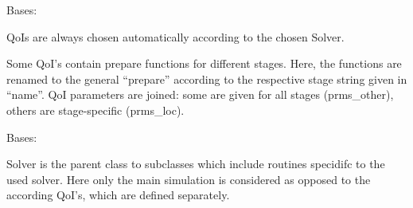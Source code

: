 \documentclass[letterpaper,10pt,english]{sphinxmanual}
\begin{document}
\begin{fulllineitems}
\label{\detokenize{solver:solver.solver.QoI}}
Bases: {\hyperref[\detokenize{solver:solver.solver.Batch}]{}}

QoIs are always chosen automatically according 
to the chosen Solver.

\begin{fulllineitems}
\label{\detokenize{solver:solver.solver.QoI.create_by_stage}}
Some QoI’s contain prepare functions for different stages. 
Here, the functions are renamed to the general “prepare” 
according to the respective stage string given in “name”.
QoI parameters are joined: some are given for all stages
(prms\_other), others are stage-specific (prms\_loc).

\end{fulllineitems}


\end{fulllineitems}


\begin{fulllineitems}
\label{\detokenize{solver:solver.solver.Solver}}
Bases: {\hyperref[\detokenize{solver:solver.solver.Batch}]{}}

Solver is the parent class to subclasses which include 
routines specidifc to the used solver. Here only the main
simulation is considered as opposed to the according QoI’s, 
which are defined separately.

\begin{fulllineitems}
\label{\detokenize{solver:solver.solver.Solver.defaults_}}
\end{fulllineitems}


\end{fulllineitems}
\end{document}
